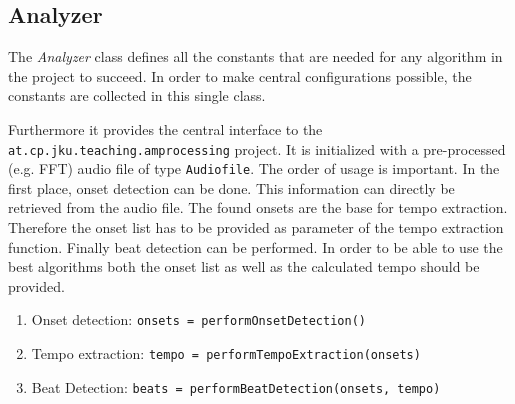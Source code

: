 \subsection{\ttfamily Analyzer}
The \emph{Analyzer} class defines all the constants that are needed for any
algorithm in the project to succeed. In order to make central configurations
possible, the constants are collected in this single class.

Furthermore it provides the central interface to the
\texttt{at.cp.jku.teaching.amprocessing} project. It is initialized with a
pre-processed (e.g. FFT) audio file of type \texttt{Audiofile}. The order of
usage is important. In the first place, onset detection can be done. This
information can directly be retrieved from the audio file. The found onsets are
the base for tempo extraction. Therefore the onset list has to be provided as
parameter of the tempo extraction function. Finally beat detection can be
performed. In order to be able to use the best algorithms both the onset list as
well as the calculated tempo should be provided.

\begin{enumerate}
  \item Onset detection: \texttt{onsets = performOnsetDetection()}
  \item Tempo extraction: \texttt{tempo = performTempoExtraction(onsets)}
  \item Beat Detection: \texttt{beats = performBeatDetection(onsets, tempo)}
\end{enumerate}